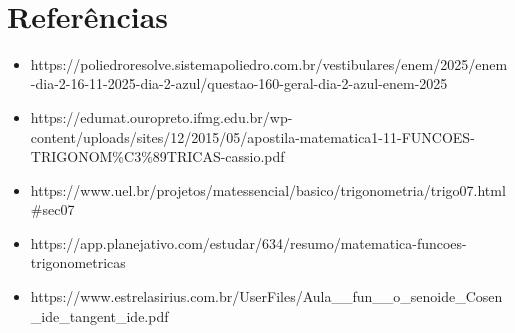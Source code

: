 \documentclass[11pt]{article}
\providecommand{\tightlist}{%
      \setlength{\itemsep}{0pt}\setlength{\parskip}{0pt}}
\begin{document}
    \begin{center}
    \end{center}
    { \hspace*{\fill} \\}
    
    \section{Referências}\label{referuxeancias}

\begin{itemize}
\tightlist
\item
  https://poliedroresolve.sistemapoliedro.com.br/vestibulares/enem/2025/enem-dia-2-16-11-2025-dia-2-azul/questao-160-geral-dia-2-azul-enem-2025
\item
  https://edumat.ouropreto.ifmg.edu.br/wp-content/uploads/sites/12/2015/05/apostila-matematica1-11-FUNCOES-TRIGONOM\%C3\%89TRICAS-cassio.pdf
\item
  https://www.uel.br/projetos/matessencial/basico/trigonometria/trigo07.html\#sec07
\item
  https://app.planejativo.com/estudar/634/resumo/matematica-funcoes-trigonometricas
\item
  https://www.estrelasirius.com.br/UserFiles/Aula\_\_fun\_\_o\_senoide\_Cosen\_ide\_tangent\_ide.pdf
\end{itemize}


    
    
    
\end{document}
